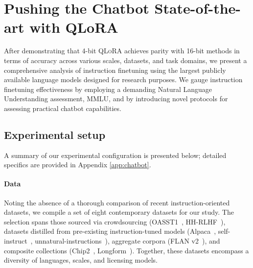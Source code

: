\section{Pushing the Chatbot State-of-the-art with QLoRA}
\label{sec:pushing}
After demonstrating that 4-bit \textsc{QLoRA} achieves parity with 16-bit methods in terms of accuracy across various scales, datasets, and task domains, we present a comprehensive analysis of instruction finetuning using the largest publicly available language models designed for research purposes. We gauge instruction finetuning effectiveness by employing a demanding Natural Language Understanding assessment, MMLU, and by introducing novel protocols for assessing practical chatbot capabilities.

\subsection{Experimental setup}
A summary of our experimental configuration is presented below; detailed specifics are provided in Appendix \ref{app:chatbot}.

\paragraph{Data} Noting the absence of a thorough comparison of recent instruction-oriented datasets, we compile a set of eight contemporary datasets for our study. The selection spans those sourced via crowdsourcing (OASST1~\citep{kopf2023openassistant}, HH-RLHF~\citep{bai2022training}), datasets distilled from pre-existing instruction-tuned models (Alpaca~\citep{alpaca}, self-instruct~\citep{wang2022self}, unnatural-instructions~\citep{honovich2022unnatural}), aggregate corpora (FLAN v2~\citep{chung2022scaling}), and composite collections (Chip2~\citep{laion2023}, Longform~\citep{koksal2023longform}). Together, these datasets encompass a diversity of languages, scales, and licensing models.

